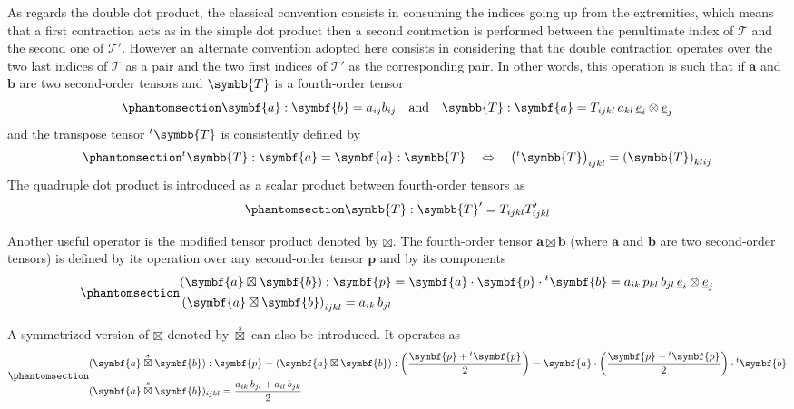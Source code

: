 \documentclass[
  a4paper,
  numbers=noendperiod,
  DIV=12]{scrreprt}
\newcommand{\uu}[1]{{\symbf{{#1}}}}
\newcommand{\uuuu}[1]{{\symbb{{#1}}}}
\newcommand{\uv}[1]{{\underline{{#1}}}}
\newcommand{\ve}[1]{{\uv{{e}}_{{#1}}}}
\newcommand{\trans}[1]{{{}^{t}{#1}}}
\newcommand{\sboxtimes}{\stackrel{s}{\boxtimes}}
\begin{document}
As regards the double dot product, the classical convention consists in
consuming the indices going up from the extremities, which means that a
first contraction acts as in the simple dot product then a second
contraction is performed between the penultimate index of
\(\mathcal{T}\) and the second one of \(\mathcal{T}'\). However an
alternate convention adopted here consists in considering that the
double contraction operates over the two last indices of \(\mathcal{T}\)
as a pair and the two first indices of \(\mathcal{T}'\) as the
corresponding pair. In other words, this operation is such that if
\(\uu{a}\) and \(\uu{b}\) are two second-order tensors and \(\uuuu{T}\)
is a fourth-order tensor
\begin{equation}\protect\phantomsection\label{eq-doubledot}{
\uu{a}:\uu{b}=a_{ij}b_{ij}
\quad\textrm{and}\quad
\uuuu{T}:\uu{a}=T_{ijkl}\, a_{kl}\, \ve{i}\otimes\ve{j}
}\end{equation} and the transpose tensor \(\trans{\uuuu{T}}\) is
consistently defined by
\begin{equation}\protect\phantomsection\label{eq-trans4}{
\trans{\uuuu{T}}:\uu{a}=\uu{a}:\uuuu{T}
\quad\Leftrightarrow\quad
\left(\trans{\uuuu{T}}\right)_{ijkl}=\left(\uuuu{T}\right)_{klij}
}\end{equation} The quadruple dot product is introduced as a scalar
product between fourth-order tensors as
\begin{equation}\protect\phantomsection\label{eq-dot4}{
\uuuu{T}:\uuuu{T}'=T_{ijkl} T'_{ijkl}
}\end{equation}

Another useful operator is the modified tensor product denoted by
\(\boxtimes\). The fourth-order tensor \(\uu{a}\boxtimes\uu{b}\) (where
\(\uu{a}\) and \(\uu{b}\) are two second-order tensors) is defined by
its operation over any second-order tensor \(\uu{p}\) and by its
components
\begin{equation}\protect\phantomsection\label{eq-boxtimes}{\begin{align}
& (\uu{a}\boxtimes\uu{b}):\uu{p}=\uu{a}\cdot\uu{p}\cdot\trans{\uu{b}}
=a_{ik}\,p_{kl}\,b_{jl}\,\ve{i}\otimes\ve{j}
\\
& \left(\uu{a}\boxtimes\uu{b}\right)_{ijkl}=a_{ik}\,b_{jl}
\end{align}}\end{equation}

A symmetrized version of \(\boxtimes\) denoted by \(\sboxtimes\) can
also be introduced. It operates as
\begin{equation}\protect\phantomsection\label{eq-sboxtimes}{\begin{align}
& (\uu{a}\sboxtimes\uu{b}):\uu{p}=
(\uu{a}\boxtimes\uu{b}):\left(\frac{\uu{p}+\trans{\uu{p}}}{2}\right)
=\uu{a}\cdot\left(\frac{\uu{p}+\trans{\uu{p}}}{2}\right)\cdot\trans{\uu{b}}
\\
& (\uu{a}\sboxtimes\uu{b})_{ijkl}=\frac{a_{ik}\,b_{jl}+a_{il}\,b_{jk}}{2}
\end{align}}\end{equation}
\end{document}
